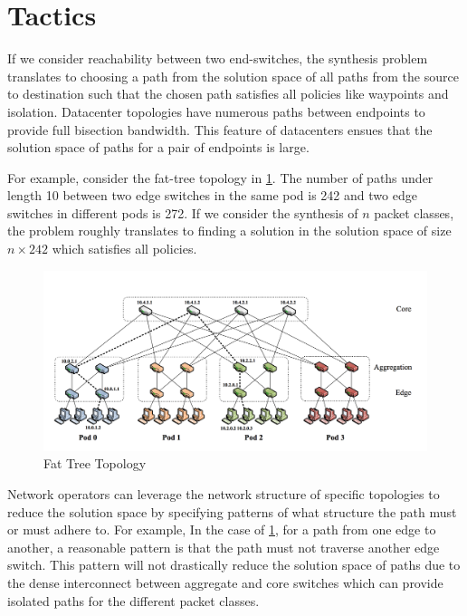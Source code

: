 \section{Tactics} \label{sec:tactic}
If we consider reachability between two end-switches, the synthesis problem translates to choosing a path from the solution space of all paths from the source to destination such that the chosen path satisfies all policies like waypoints and isolation. Datacenter topologies have numerous paths between endpoints to provide full bisection bandwidth. This feature of datacenters ensues that the solution space of paths for a pair of endpoints is large. 

For example, consider the fat-tree topology in \cref{fig:fattree}. The number of paths under length 10 between two edge  switches in the same pod is 242 and two edge switches in different pods is 272. If we consider the synthesis of $n$ packet classes, the problem roughly translates to finding a solution in the solution space of size $n \times 242$ which satisfies all policies. 
\begin{figure}[H]
	\includegraphics[width=\columnwidth]{fattree.png}
	\caption{Fat Tree Topology}
	\label{fig:fattree}
\end{figure}
Network operators can leverage the network structure of specific topologies to reduce the solution space by specifying patterns of what structure the path must or must adhere to. For example, In the case of \cref{fig:fattree}, for a path from one edge to another, a reasonable pattern is that the path must not traverse another edge switch. This pattern will not drastically reduce the solution space of paths due to the dense interconnect between aggregate and core switches which can provide isolated paths for the different packet classes. 


